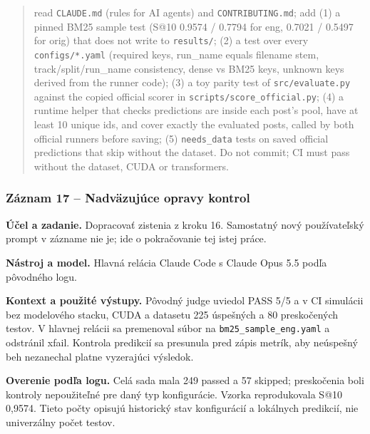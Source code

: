 \begin{quote}\normalsize read \texttt{CLAUDE.\allowbreak{}md} (rules for AI agents) and \texttt{CONTRIBUTING\allowbreak{}.\allowbreak{}md}; add (1) a pinned BM25 sample test (S@10 0.9574 / 0.7794 for eng, 0.7021 / 0.5497 for orig) that does not write to \texttt{results/\allowbreak{}}; (2) a test over every \texttt{configs/\allowbreak{}*.\allowbreak{}yaml} (required keys, run\_name equals filename stem, track/split/run\_name consistency, dense vs BM25 keys, unknown keys derived from the runner code); (3) a toy parity test of \texttt{src/\allowbreak{}evaluate.\allowbreak{}py} against the copied official scorer in \texttt{scripts/\allowbreak{}score\_\allowbreak{}official.\allowbreak{}py}; (4) a runtime helper that checks predictions are inside each post's pool, have at least 10 unique ids, and cover exactly the evaluated posts, called by both official runners before saving; (5) \texttt{needs\_\allowbreak{}data} tests on saved official predictions that skip without the dataset. Do not commit; CI must pass without the dataset, CUDA or transformers.\end{quote}

\subsubsection*{Záznam 17 -- Nadväzujúce opravy kontrol}


\par\noindent \textbf{Účel a zadanie.} Dopracovať zistenia z kroku 16. Samostatný nový používateľský prompt v zázname nie je; ide o pokračovanie tej istej práce.\par\smallskip
\par\noindent \textbf{Nástroj a model.} Hlavná relácia Claude Code s Claude Opus 5.5 podľa pôvodného logu.\par\smallskip
\par\noindent \textbf{Kontext a použité výstupy.} Pôvodný judge uviedol PASS 5/5 a v CI simulácii bez modelového stacku, CUDA a datasetu 225 úspešných a 80 preskočených testov. V hlavnej relácii sa premenoval súbor na \texttt{bm25\_\allowbreak{}sample\_\allowbreak{}eng.\allowbreak{}yaml} a odstránil xfail. Kontrola predikcií sa presunula pred zápis metrík, aby neúspešný beh nezanechal platne vyzerajúci výsledok.\par\smallskip
\par\noindent \textbf{Overenie podľa logu.} Celá sada mala 249 passed a 57 skipped; preskočenia boli kontroly nepoužiteľné pre daný typ konfigurácie. Vzorka reprodukovala S@10 0,9574. Tieto počty opisujú historický stav konfigurácií a lokálnych predikcií, nie univerzálny počet testov.\par\smallskip

